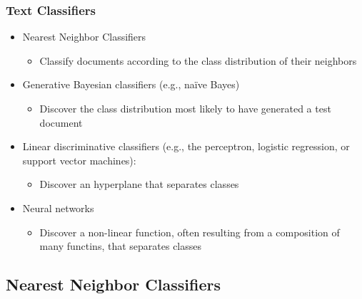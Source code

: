 \documentclass{beamer}
\begin{document}

\begin{frame}
  \frametitle{Text Classifiers}

  \begin{itemize}
  \item Nearest Neighbor Classifiers
    \begin{itemize}
    \item Classify documents according to the class distribution of their neighbors
    \end{itemize}
  \item Generative Bayesian classifiers (e.g., na{\"i}ve Bayes)
    \begin{itemize}
    \item Discover the class distribution most likely to have generated a test
      document
    \end{itemize}
  \item Linear discriminative classifiers (e.g., the perceptron, logistic regression, or support vector machines):
    \begin{itemize}
    \item Discover an hyperplane that separates classes
    \end{itemize}
  \item Neural networks
    \begin{itemize}
    \item Discover a non-linear function, often resulting from a composition of many functins, that separates classes
    \end{itemize}    
  \end{itemize}

\end{frame}

\subsection{Nearest Neighbor Classifiers}
\end{document}
